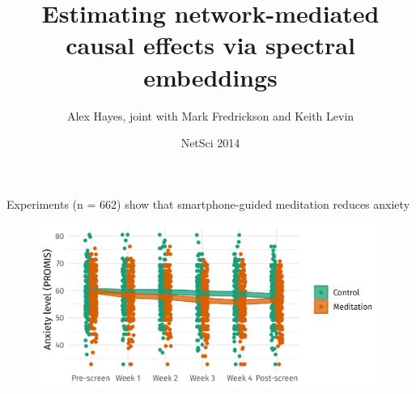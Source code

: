 \documentclass[aspectratio=169]{beamer}
\title{Estimating network-mediated causal effects via spectral embeddings}
\date{NetSci 2014}
\author{Alex Hayes, joint with Mark Fredrickson and Keith Levin }
\institute{University of Wisconsin-Madison}
\theoremstyle{remark}
\begin{document}
\maketitle

{
    \begin{frame}
    \end{frame}
}

\begin{frame}{Experiments (n = 662) show that smartphone-guided meditation reduces anxiety}
    \begin{figure}
        \centering
        \includegraphics{./figures/ate.png}
    \end{figure}
\end{frame}
\end{document}
